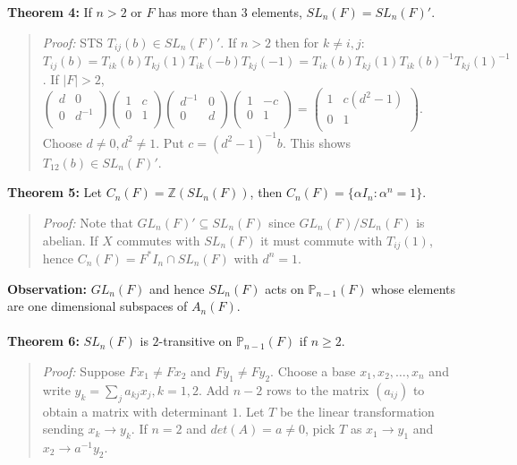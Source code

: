 {\bf Theorem 4:}  If $n>2$ or $F$ has more than $3$ elements,
$SL_n(F) = SL_n(F)'$.
\begin{quote}
\emph{Proof:} 
STS $T_{ij}(b) \in SL_n(F)'$.  If $n>2$ then for $k \ne i, j$:
$T_{ij}(b)= T_{ik}(b) T_{kj}(1) T_{ik}(-b) T_{kj}(-1)=
T_{ik}(b) T_{kj}(1) T_{ik}(b)^{-1} T_{kj}(1)^{-1}$.
If $|F|>2$, $
\left(
\begin{array}{cc}
d &  0 \\
0 &  d^{-1} \\
\end{array}
\right) 
\left(
\begin{array}{cc}
1 &  c \\
0 &  1 \\
\end{array}
\right) 
\left(
\begin{array}{cc}
d^{-1} &  0 \\
0 &  d \\
\end{array}
\right) 
\left(
\begin{array}{cc}
1 &  -c \\
0 &  1 \\
\end{array}
\right) =
\left(
\begin{array}{cc}
1 &  c(d^2-1) \\
0 &  1 \\
\end{array}
\right)$.  
Choose $d \neq 0, d^2 \neq 1$. Put $c= (d^2-1)^{-1} b$.
This shows $T_{12}(b) \in SL_n(F)'$.
\end{quote}
{\bf Theorem 5:}  Let $C_n(F)= {\mathbb Z}(SL_n(F))$, then $C_n(F)= \{ \alpha I_n : \alpha^n=1 \}$.
\begin{quote}
\emph{Proof:}  
Note that $GL_n(F)' \subseteq SL_n(F)$ since 
$GL_n(F)/SL_n(F)$ is abelian.  If $X$ commutes with $SL_n(F)$ it must commute with
$T_{ij}(1)$, hence  $C_n(F)= F^* I_n \cap SL_n(F)$ with $d^n=1$.
\end{quote}
{\bf Observation:}  $GL_n(F)$ and hence $SL_n(F)$ acts on ${\mathbb P}_{n-1}(F)$ whose elements
are one dimensional subspaces of $A_n(F)$.
\\
\\
{\bf Theorem 6:}  $SL_n(F)$ is $2$-transitive on ${\mathbb P}_{n-1}(F)$ if $n \ge 2$.
\begin{quote}
\emph{Proof:}  
Suppose 
$Fx_1 \ne F x_2$ and
$Fy_1 \ne F y_2$.  Choose a base $x_1, x_2, \ldots , x_n$ and write
$y_k= \sum_j a_{kj}x_j , k= 1,2$.  Add $n-2$ rows to the matrix $(a_{ij})$ to obtain
a matrix with determinant $1$.  Let $T$ be the  linear transformation
sending $x_k \rightarrow y_k$.  If $n=2$ 
and $det(A)=a \ne 0$, pick $T$ as 
$x_1 \rightarrow y_1$ and $x_2 \rightarrow a^{-1} y_2$.
\end{quote}
